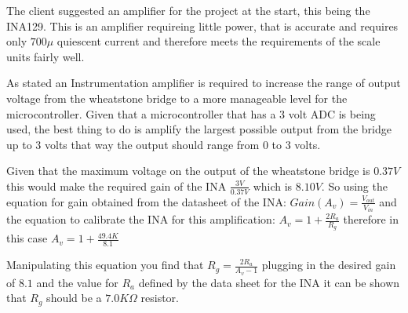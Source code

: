 

The client suggested an amplifier for the project at the start, this being the INA129. This is an amplifier requireing little power, that is accurate and requires only $700\mu$ quiescent current and therefore meets the requirements of the scale units fairly well.

As stated an Instrumentation amplifier is required to increase the range of output voltage from the wheatstone bridge to a more manageable level for the microcontroller. Given that a microcontroller that has a $3$ volt ADC is being used, the best thing to do is amplify the largest possible output from the bridge up to $3$ volts that way the output should range from $0$ to $3$ volts. 

Given that the maximum voltage on the output of the wheatstone bridge is $0.37V$ this would make the required gain of the INA $\frac{3V}{0.37V}$ which is $8.10V$. So using the equation for gain obtained from the datasheet of the INA: \(Gain(A_{v}) = \frac{V_{out}}{V_{in}}\) and the equation to calibrate the INA for this amplification: 
$A_v = 1 + \frac{2R_a}{R_g}$ therefore in this case $A_v = 1 + \frac{49.4K}{8.1}$

Manipulating this equation you find that $R_g = \frac{2R_a}{A_v - 1}$ plugging in the desired gain of $8.1$ and the value for $R_a$ defined by the data sheet for the INA it can be shown that $R_g$ should be a $7.0K\Omega$ resistor. 